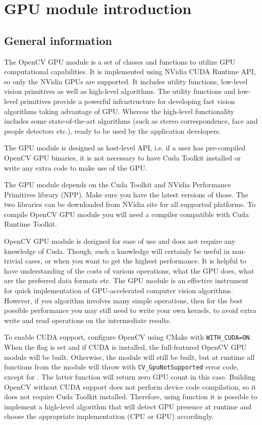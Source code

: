 \section{GPU module introduction}

\subsection{General information}

The OpenCV GPU module is a set of classes and functions to utilize GPU computational capabilities. It is implemented using NVidia CUDA Runtime API, so only the NVidia GPUs are supported. It includes utility functions, low-level vision primitives as well as high-level algorithms. The utility functions and low-level primitives provide a powerful infrastructure for developing fast vision algorithms taking advantage of GPU. Whereas the high-level functionality includes some state-of-the-art algorithms (such as stereo correspondence, face and people detectors etc.), ready to be used by the application developers.   

The GPU module is designed as host-level API, i.e. if a user has pre-compiled OpenCV GPU binaries, it is not necessary to have Cuda Toolkit installed or write any extra code to make use of the GPU.

The GPU module depends on the Cuda Toolkit and NVidia Performance Primitives library (NPP). Make sure you have the latest versions of those. The two libraries can be downloaded from NVidia site for all supported platforms. To compile OpenCV GPU module you will need a compiler compatible with Cuda Runtime Toolkit.

OpenCV GPU module is designed for ease of use and does not require any knowledge of Cuda. Though, such a knowledge will certainly be useful in non-trivial cases, or when you want to get the highest performance. It is helpful to have understanding of the costs of various operations, what the GPU does, what are the preferred data formats etc. The GPU module is an effective instrument for quick implementation of GPU-accelerated computer vision algorithms. However, if you algorithm involves many simple operations, then for the best possible performance you may still need to write your own kernels, to avoid extra write and read operations on the intermediate results.

To enable CUDA support, configure OpenCV using CMake with \texttt{WITH\_CUDA=ON}. When the flag is set and if CUDA is installed, the full-featured OpenCV GPU module will be built. Otherwise, the module will still be built, but at runtime all functions from the module will throw  with \texttt{CV\_GpuNotSupported} error code, except for . The latter function will return zero GPU count in this case. Building OpenCV without CUDA support does not perform device code compilation, so it does not require Cuda Toolkit installed. Therefore, using   function it is possible to implement a high-level algorithm that will detect GPU presence at runtime and choose the appropriate implementation (CPU or GPU) accordingly.

